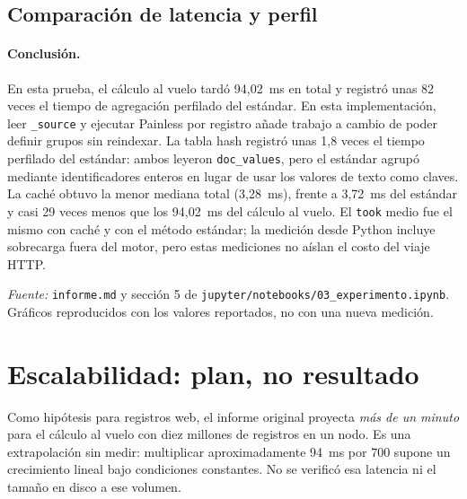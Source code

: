 \documentclass[11pt,a4paper]{article}
\newcommand{\codigo}[1]{\texttt{#1}}
\newcommand{\fuente}[1]{\par\smallskip\noindent\textit{Fuente:} #1\par}
\begin{document}
\clearpage
\subsection*{Comparación de latencia y perfil}
\begin{center}

\end{center}

\paragraph{Conclusión.}
En esta prueba, el cálculo al vuelo tardó 94,02~ms en total y registró
unas 82 veces el tiempo de agregación perfilado del estándar. En esta
implementación, leer \codigo{\_source} y ejecutar Painless por registro
añade trabajo a cambio de poder definir grupos sin reindexar. La tabla
hash registró unas 1,8 veces el tiempo perfilado del estándar: ambos
leyeron \codigo{doc\_values}, pero el estándar agrupó mediante identificadores
enteros en lugar de usar los valores de texto como claves.
La caché obtuvo la menor mediana total (3,28~ms), frente a 3,72~ms del
estándar y casi 29 veces menos que los 94,02~ms del cálculo al vuelo.
El \codigo{took} medio fue el mismo con caché y con el método estándar;
la medición desde Python incluye sobrecarga fuera del motor, pero estas
mediciones no aíslan el costo del viaje HTTP.
\fuente{\nolinkurl{informe.md} y sección 5 de
\nolinkurl{jupyter/notebooks/03_experimento.ipynb}. Gráficos reproducidos
con los valores reportados, no con una nueva medición.}

\section{Escalabilidad: plan, no resultado}
Como hipótesis para registros web, el informe original proyecta
\emph{más de un minuto} para el cálculo al vuelo con diez millones de
registros en un nodo. Es una extrapolación sin medir: multiplicar
aproximadamente 94~ms por 700 supone un crecimiento lineal bajo condiciones
constantes. No se verificó esa latencia ni el tamaño en disco a ese volumen.
\end{document}
